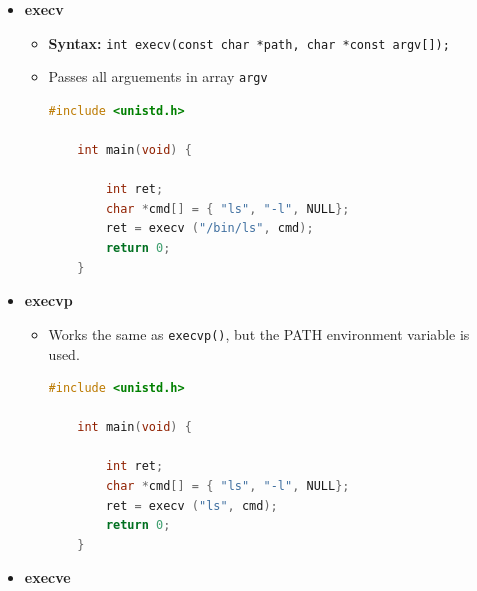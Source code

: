 \documentclass[12pt]{article}
\begin{document}
\begin{enumerate}[1.]
\begin{itemize}
        \item \textbf{execv}
        \begin{itemize}
            \item \textbf{Syntax:} \texttt{int execv(const char *path, char *const argv[]);}
            \item Passes all arguements in array \texttt{argv}

\begin{lstlisting}[language=c]
    #include <unistd.h>

    int main(void) {

        int ret;
        char *cmd[] = { "ls", "-l", NULL};
        ret = execv ("/bin/ls", cmd);
        return 0;
    }
\end{lstlisting}
        \end{itemize}

        \item \textbf{execvp}

        \begin{itemize}
            \item Works the same as \texttt{execvp()}, but the PATH environment variable is used.


\begin{lstlisting}[language=c]
    #include <unistd.h>

    int main(void) {

        int ret;
        char *cmd[] = { "ls", "-l", NULL};
        ret = execv ("ls", cmd);
        return 0;
    }
\end{lstlisting}
        \end{itemize}
        \item \textbf{execve}
    \end{itemize}




\end{enumerate}
\end{document}
